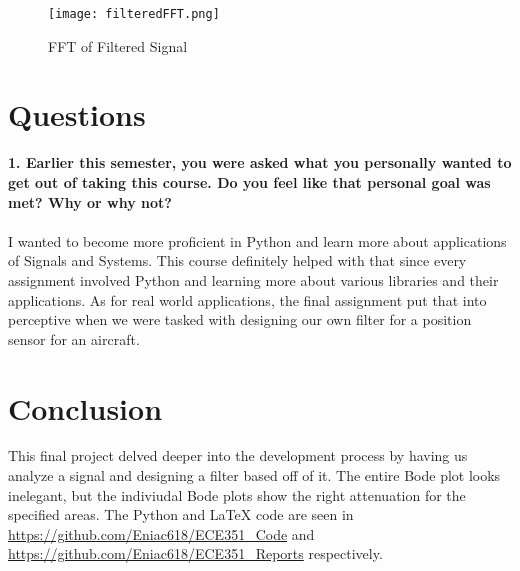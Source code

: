 \documentclass[12pt]{report}
\begin{document}
\begin{figure}[htp]
    \centering
    \texttt{[image: filteredFFT.png]}
    \caption{FFT of Filtered Signal}
\end{figure}

\pagebreak

\section{Questions}
\textbf{1. Earlier this semester, you were asked what you personally wanted to get out of taking this
course. Do you feel like that personal goal was met? Why or why not?} \\ \\
I wanted to become more proficient in Python and learn more about applications of Signals and Systems. This course definitely helped with that since every assignment involved Python and learning more about various libraries and their applications. As for real world applications, the final assignment put that into perceptive when we were tasked with designing our own filter for a position sensor for an aircraft.

\section{Conclusion}
This final project delved deeper into the development process by having us analyze a signal and designing a filter based off of it. The entire Bode plot looks inelegant, but the indiviudal Bode plots show the right attenuation for the specified areas. The Python and \LaTeX{} code are seen in \url{https://github.com/Eniac618/ECE351_Code} and \url{https://github.com/Eniac618/ECE351_Reports} respectively.
\end{document}
